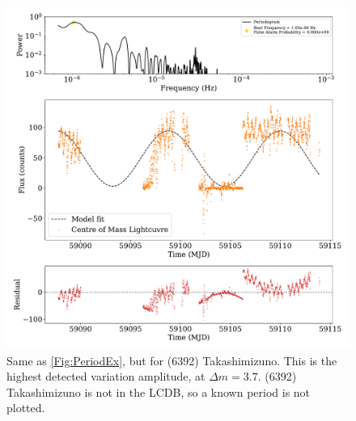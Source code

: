 \documentclass{UCreport}
\begin{document}
\begin{figure}
  \centering
  \includegraphics[width = \textwidth]{Figures/PeriodogramTakashimizunoResid.pdf}
  \caption[(6392) Takashimizuno Periodogram]{Same as \autoref{Fig:PeriodEx}, but for (6392) Takashimizuno.
  This is the highest detected variation amplitude, at $\Delta m = 3.7$.
  (6392) Takashimizuno is not in the LCDB, so a known period is not plotted.
  }
  \label{ApFig:Takashimizuno}
\end{figure}
\end{document}

